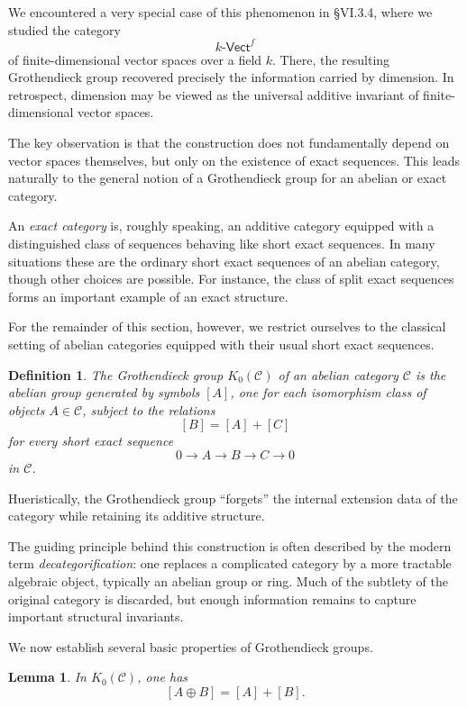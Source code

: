 \documentclass[12pt,reqno]{amsart}
\theoremstyle{plain}
\newtheorem{defn}[thm]{Definition}
\numberwithin{equation}{section}
\newtheorem{lemma}{Lemma}
\begin{document}
We encountered a very special case of this phenomenon in \S VI.3.4, where we studied the category
\[
k\textsf{-Vect}^f
\]
of finite-dimensional vector spaces over a field $k$. 
There, the resulting Grothendieck group recovered precisely the information carried by dimension. In retrospect, dimension may be viewed as the universal additive invariant of finite-dimensional vector spaces.

The key observation is that the construction does not fundamentally depend on vector spaces themselves, but only on the existence of exact sequences. This leads naturally to the general notion of a Grothendieck group for an abelian or exact category.

An \emph{exact category} is, roughly speaking, an additive category equipped with a distinguished class of sequences behaving like short exact sequences. In many situations these are the ordinary short exact sequences of an abelian category, though other choices are possible. For instance, the class of split exact sequences forms an important example of an exact structure.

For the remainder of this section, however, we restrict ourselves to the classical setting of abelian categories equipped with their usual short exact sequences.

\begin{defn}
The \emph{Grothendieck group} $K_0(\mathcal C)$ of an abelian category $\mathcal{C}$ is the abelian group generated by symbols $[A]$, one for each isomorphism class of objects $A\in \mathcal C$, subject to the relations
\[
[B]=[A]+[C]
\]
for every short exact sequence
\[
0\longrightarrow A\longrightarrow B\longrightarrow C\longrightarrow 0
\]
in $\mathcal C$.
\end{defn}

Hueristically, the Grothendieck group ``forgets'' the internal extension data of the category while retaining its additive structure.

The guiding principle behind this construction is often described by the modern term \emph{decategorification}: one replaces a complicated category by a more tractable algebraic object, typically an abelian group or ring. Much of the subtlety of the original category is discarded, but enough information remains to capture important structural invariants.

We now establish several basic properties of Grothendieck groups.

\begin{lemma}\label{lem: direct sum}
In $K_0(\mathcal C)$, one has
\[
[A\oplus B]=[A]+[B].
\]
\end{lemma}
\end{document}
